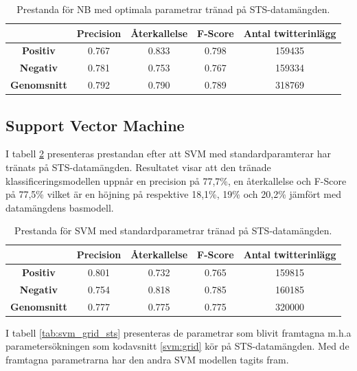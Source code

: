 \documentclass{kaumasters} %
\begin{document}
\begin{table}[H]
\centering
\caption{Prestanda för NB med optimala parametrar tränad på STS-datamängden.}
\label{tab:nb_imp_sts}
    \begin{tabular}{ccccc}
    \toprule
     & \textbf{Precision} & \textbf{Återkallelse} & \textbf{F-Score} & \textbf{Antal twitterinlägg}  \\
    \midrule
    \textbf{Positiv} & 0.767 & 0.833 & 0.798 & 159435 \\
    \textbf{Negativ} & 0.781 & 0.753 & 0.767 & 159334 \\
    \midrule
    \textbf{Genomsnitt} & 0.792 & 0.790 & 0.789  & 318769 \\
    \bottomrule
\end{tabular}
\end{table}

\subsection{Support Vector Machine}
I tabell \ref{tab:svm_base_sts} presenteras prestandan efter att SVM med standardparamterar har tränats på STS-datamängden. Resultatet visar att den tränade klassificeringsmodellen uppnår en precision på 77,7\%, en återkallelse och F-Score på 77,5\% vilket är en höjning på respektive 18,1\%, 19\% och 20,2\% jämfört med datamängdens basmodell. 

\begin{table}[H]
\centering
\caption{Prestanda för SVM med standardparametrar tränad på STS-datamängden.}
\label{tab:svm_base_sts}
    \begin{tabular}{ccccc}
    \toprule
     & \textbf{Precision} & \textbf{Återkallelse} & \textbf{F-Score} & \textbf{Antal twitterinlägg}  \\
    \midrule
    \textbf{Positiv} & 0.801 & 0.732 & 0.765 & 159815 \\
    \textbf{Negativ} & 0.754 & 0.818 & 0.785 & 160185 \\
    \midrule
    \textbf{Genomsnitt} & 0.777 & 0.775 & 0.775  & 320000 \\
    \bottomrule
\end{tabular}
\end{table}

I tabell \ref{tab:svm_grid_sts} presenteras de parametrar som blivit framtagna m.h.a parametersökningen som kodavsnitt \ref{svm:grid} kör på STS-datamängden. Med de framtagna parametrarna har den andra SVM modellen tagits fram. 
\end{document}
